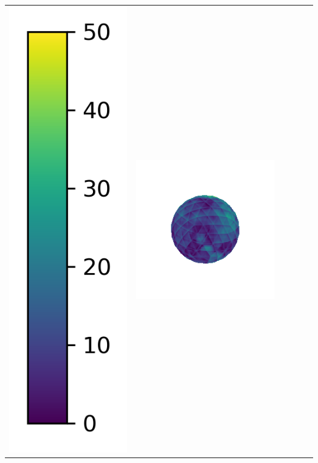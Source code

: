 \begin{center}
\begin{tabularx}{\linewidth}{@{}Y@{}Y@{}Y@{}Y@{}Y@{}Y@{}}
\includegraphics[width=0.2\linewidth]{semisynthetic/colorbar_error_vertical.png} &
\includegraphics[width=\linewidth]{semisynthetic/20150514_1_ours_err.png} &

\end{tabularx}
\end{center}
